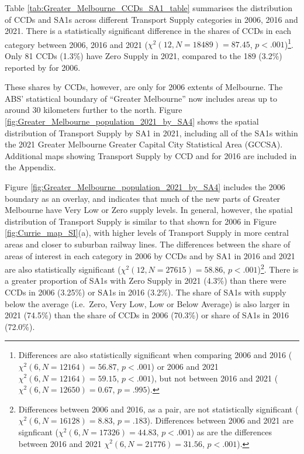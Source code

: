 \documentclass[preprint, 3p,
authoryear]{elsarticle} %
\begin{document}
Table \ref{tab:Greater_Melbourne_CCDs_SA1_table} summarises the
distribution of CCDs and SA1s across different Transport Supply
categories in 2006, 2016 and 2021. There is a statistically significant
difference in the shares of CCDs in each category between 2006, 2016 and
2021 (\(\chi^2(12, N = 18489) = 87.45\), \(p < .001\))\footnote{Differences
  are also statistically significant when comparing 2006 and 2016
  (\(\chi^2(6, N = 12164) = 56.87\), \(p < .001\)) or 2006 and 2021
  \(\chi^2(6, N = 12164) = 59.15\), \(p < .001\)), but not between 2016
  and 2021 (\(\chi^2(6, N = 12650) = 0.67\), \(p = .995\)).}. Only 81
CCDs (1.3\%) have Zero Supply in 2021, compared to the 189 (3.2\%)
reported by \citet{currie2010identifying} for 2006.

These shares by CCDs, however, are only for 2006 extents of Melbourne.
The ABS' statistical boundary of ``Greater Melbourne'' now includes
areas up to around 30 kilometers further to the north. Figure
\ref{fig:Greater_Melbourne_population_2021_by_SA4} shows the spatial
distribution of Transport Supply by SA1 in 2021, including all of the
SA1s within the 2021 Greater Melbourne Greater Capital City Statistical
Area (GCCSA). Additional maps showing Transport Supply by CCD and for
2016 are included in the Appendix.

Figure \ref{fig:Greater_Melbourne_population_2021_by_SA4} includes the
2006 boundary as an overlay, and indicates that much of the new parts of
Greater Melbourne have Very Low or Zero supply levels. In general,
however, the spatial distribution of Transport Supply is similar to that
shown for 2006 in Figure \ref{fig:Currie_map_SI}(a), with higher levels
of Transport Supply in more central areas and closer to suburban railway
lines. The differences between the share of areas of interest in each
category in 2006 by CCDs and by SA1 in 2016 and 2021 are also
statistically significant (\(\chi^2(12, N = 27615) = 58.86\),
\(p < .001\))\footnote{Differences between 2006 and 2016, as a pair, are
  not statistically significant (\(\chi^2(6, N = 16128) = 8.83\),
  \(p = .183\)). Differences between 2006 and 2021 are signficant
  (\(\chi^2(6, N = 17326) = 44.83\), \(p < .001\)) as are the
  differences between 2016 and 2021 \(\chi^2(6, N = 21776) = 31.56\),
  \(p < .001\)).}. There is a greater proportion of SA1s with Zero
Supply in 2021 (4.3\%) than there were CCDs in 2006 (3.25\%) or SA1s in
2016 (3.2\%). The share of SA1s with supply below the average
(i.e.~Zero, Very Low, Low or Below Average) is also larger in 2021
(74.5\%) than the share of CCDs in 2006 (70.3\%) or share of SA1s in
2016 (72.0\%).
\end{document}
